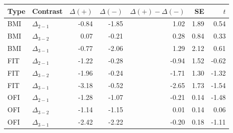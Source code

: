\begin{tabular}{llrrrrr}
\toprule
Type & Contrast & $\Delta(+)$ & $\Delta(-)$ & $\Delta(+) - \Delta(-)$ & SE & $t$ \\
\midrule
BMI & $\Delta_{2-1}$ & -0.84 & -1.85 & 1.02 & 1.89 & 0.54 \\
BMI & $\Delta_{3-2}$ & 0.07 & -0.21 & 0.28 & 0.84 & 0.33 \\
BMI & $\Delta_{3-1}$ & -0.77 & -2.06 & 1.29 & 2.12 & 0.61 \\
\addlinespace
FIT & $\Delta_{2-1}$ & -1.22 & -0.28 & -0.94 & 1.52 & -0.62 \\
FIT & $\Delta_{3-2}$ & -1.96 & -0.24 & -1.71 & 1.30 & -1.32 \\
FIT & $\Delta_{3-1}$ & -3.18 & -0.52 & -2.65 & 1.73 & -1.54 \\
\addlinespace
OFI & $\Delta_{2-1}$ & -1.28 & -1.07 & -0.21 & 0.14 & -1.48 \\
OFI & $\Delta_{3-2}$ & -1.14 & -1.15 & 0.01 & 0.14 & 0.06 \\
OFI & $\Delta_{3-1}$ & -2.42 & -2.22 & -0.20 & 0.18 & -1.11 \\
\bottomrule
\end{tabular}
